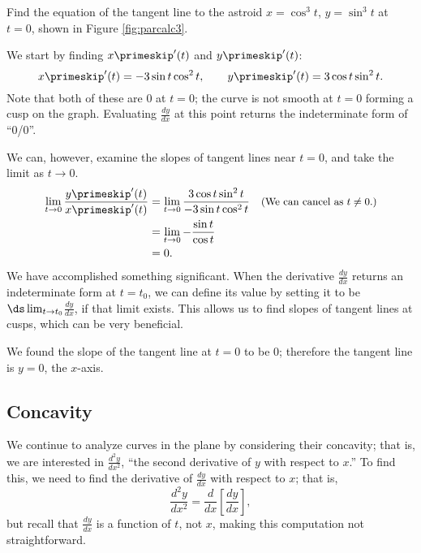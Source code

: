 {Find the equation of the tangent line to the astroid $x=\cos^3 t$, $y=\sin^3t$ at $t=0$, shown in Figure \ref{fig:parcalc3}.
}
{We start by finding $x\primeskip'(t)$ and $y\primeskip'(t)$:
$$ x\primeskip'(t) = -3\sin t\cos^2t, \qquad y\primeskip'(t) = 3\cos t\sin^2t.$$
Note that both of these are 0 at $t=0$; the curve is not smooth at $t=0$ forming a cusp on the graph. Evaluating $\frac{dy}{dx}$ at this point returns the indeterminate form of ``0/0''. 

We can, however, examine the slopes of tangent lines near $t=0$, and take the limit as $t\to 0$. 
\begin{align*}
\lim_{t\to0} \frac{y\primeskip'(t)}{x\primeskip'(t)} &=\lim_{t\to0} \frac{3\cos t\sin^2t}{-3\sin t\cos^2t} \quad \text{\small (We can cancel as $t\neq 0$.)}\\
					&= \lim_{t\to0} -\frac{\sin t}{\cos t}\\
					&= 0.
\end{align*}
We have accomplished something significant. When the derivative $\frac{dy}{dx}$ returns an indeterminate form at $t=t_0$, we can define its value by setting it to be $\ds \lim_{t\to t_0} $$\frac{dy}{dx}$, if that limit exists. This allows us to find slopes of tangent lines at cusps, which can be very beneficial. 

We found the slope of the tangent line at $t=0$ to be 0; therefore the tangent line is $y=0$, the $x$-axis.}

\subsection*{Concavity}

We continue to analyze curves in the plane by considering their concavity; that is, we are interested in $\frac{d^2y}{dx^2}$, ``the second derivative of $y$ with respect to $x$.'' To find this, we need to find the derivative of $\frac{dy}{dx}$ with respect to $x$; that is,  $$\frac{d^2y}{dx^2}=\frac{d}{dx}\left[\frac{dy}{dx}\right],$$ but recall that $\frac{dy}{dx}$ is a function of $t$, not $x$, making this computation not straightforward. 

